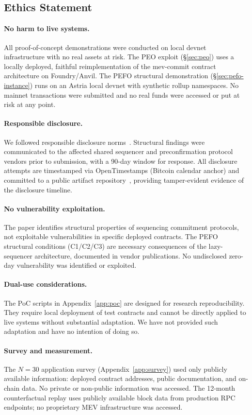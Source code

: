 
\subsection{Ethics Statement}
\label{app:ethics}

\paragraph{No harm to live systems.}
All proof-of-concept demonstrations were conducted on local devnet
infrastructure with no real assets at risk. The PEO exploit
(\S\ref{sec:peo}) uses a locally deployed, faithful reimplementation of the
mev-commit contract architecture on Foundry/Anvil. The PEFO structural
demonstration (\S\ref{sec:pefo-instance}) runs on an Astria local devnet
with synthetic rollup namespaces. No mainnet transactions were submitted and
no real funds were accessed or put at risk at any point.

\paragraph{Responsible disclosure.}
We followed responsible disclosure norms~\cite{iso29147}. Structural findings
were communicated to the affected shared sequencer and preconfirmation protocol
vendors prior to submission, with a 90-day window for response. All disclosure
attempts are timestamped via OpenTimestamps (Bitcoin calendar anchor) and
committed to a public artifact repository~\cite{artifact-repo}, providing
tamper-evident evidence of the disclosure timeline.

\paragraph{No vulnerability exploitation.}
The paper identifies structural properties of sequencing commitment protocols,
not exploitable vulnerabilities in specific deployed contracts. The PEFO
structural conditions (C1/C2/C3) are necessary consequences of the
lazy-sequencer architecture, documented in vendor publications. No
undisclosed zero-day vulnerability was identified or exploited.

\paragraph{Dual-use considerations.}
The PoC scripts in Appendix~\ref{app:poc} are designed for research
reproducibility. They require local deployment of test contracts and cannot
be directly applied to live systems without substantial adaptation. We have
not provided such adaptation and have no intention of doing so.

\paragraph{Survey and measurement.}
The $N=30$ application survey (Appendix~\ref{app:survey}) used only publicly
available information: deployed contract addresses, public documentation, and
on-chain data. No private or non-public information was accessed. The
12-month counterfactual replay uses publicly available block data from
production RPC endpoints; no proprietary MEV infrastructure was accessed.
